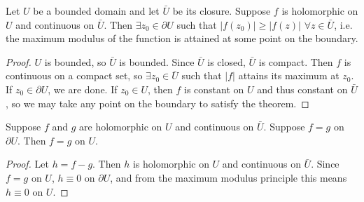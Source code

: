 \begin{theorem}
Let $U$ be a bounded domain and let $\bar{U}$ be its closure.
Suppose $f$ is holomorphic on $U$ and continuous on $\bar{U}$.
Then $\exists z_0 \in \partial U$ such that $|f(z_0)| \geq |f(z)|$
$\forall z \in \bar{U}$, i.e. the maximum modulus of the function is
attained at some point on the boundary.
\end{theorem}

\begin{proof}
$U$ is bounded, so $\bar{U}$ is bounded. Since $\bar{U}$ is closed,
$\bar{U}$ is compact. Then $f$ is continuous on a compact set, so
$\exists z_0 \in \bar{U}$ such that $|f|$ attains its maximum at
$z_0$. If $z_0 \in \partial U$, we are done. If $z_0 \in U$, then
$f$ is constant on $U$ and thus constant on $\bar{U}$, so we may
take any point on the boundary to satisfy the theorem.
\end{proof}

\begin{corol}
Suppose $f$ and $g$ are holomorphic on $U$ and continuous on $\bar{U}$.
Suppose $f = g$ on $\partial U$. Then $f = g$ on $U$.
\end{corol}

\begin{proof}
Let $h = f - g$. Then $h$ is holomorphic on $U$ and continuous on
$\bar{U}$. Since $f = g$ on $U$, $h \equiv 0$ on $\partial U$, and from
the maximum modulus principle this means $h \equiv 0$ on $U$.
\end{proof}
